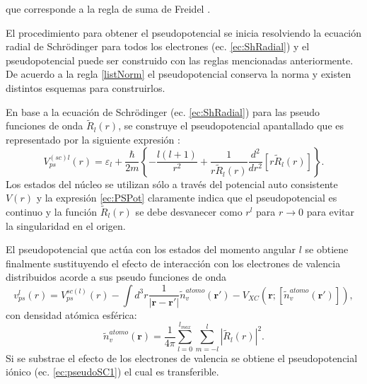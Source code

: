    que corresponde a la regla de suma de Freidel \cite{PhysRev.163.604}.
   \newline 
   \par El procedimiento para obtener el pseudopotencial  se inicia resolviendo la ecuaci\'on radial de Schr\"odinger para todos los electrones (ec. \ref{ec:ShRadial}) y el pseudopotencial puede ser construido con las reglas mencionadas anteriormente. De acuerdo a la regla \ref{listNorm} el pseudopotencial conserva la norma y existen distintos esquemas para construirlos.
   \newline
   \par En base a la ecuaci\'on de Schr\"odinger (ec. \ref{ec:ShRadial}) para las pseudo funciones de onda $\tilde{R}_l (r)$,  se construye  el pseudopotencial apantallado que es representado por la siguiente expresi\'on \cite{PhysRevB.26.4199}:
   \begin{equation}
   V_{ps}^{(sc)l} (r) = \varepsilon_l + \frac{\hbar}{2m} \left\{-\frac{l (l+1)}{r^2} + \frac{1}{r \tilde{R}_l (r)} \frac{d^2}{dr^2} [r \tilde{R}_l (r)]\right\} \label{ec:PSPot}.
   \end{equation}
    Los estados del n\'ucleo se utilizan  s\'olo a trav\'es del potencial auto consistente $V(r)$ y la expresi\'on \ref{ec:PSPot} claramente indica que el pseudopotencial es continuo y la funci\'on $\tilde{R}_l (r)$ se debe desvanecer como $r^l$ para $r \rightarrow 0$ para evitar la singularidad en el origen.
   \newline
   \par El pseudopotencial que act\'ua con los estados del momento angular $l$ se obtiene finalmente sustituyendo el efecto de interacci\'on con los electrones de valencia distribuidos acorde a sus pseudo funciones de onda \cite{PhysRevB.26.4199}
   \begin{equation}
   v_{ps}^l (r) = V_{ps}^{sc(l)} (r) - \int d^3 r \frac{1}{|\pmb{r}-\pmb{r'}|} \tilde{n}_v^{atomo} (\pmb{r'}) - V_{XC} (\pmb{r}; [\tilde{n}_v^{atomo} (\pmb{r'})]), \label{ec:pseudoSC1}
   \end{equation}   
   con densidad at\'omica esf\'erica:
   \begin{equation}
   \tilde{n}_v^{atomo} (\pmb{r})= \frac{1}{4 \pi} \sum_{l=0}^{l_{max}} \sum_{m=-l}^{l} |\tilde{R}_l (r)|^2. \label{ec:densAtomo}
   \end{equation}
   Si se substrae el efecto de los electrones de valencia se obtiene el pseudopotencial i\'onico (ec. \ref{ec:pseudoSC1}) el cual  es transferible.
   \newline
